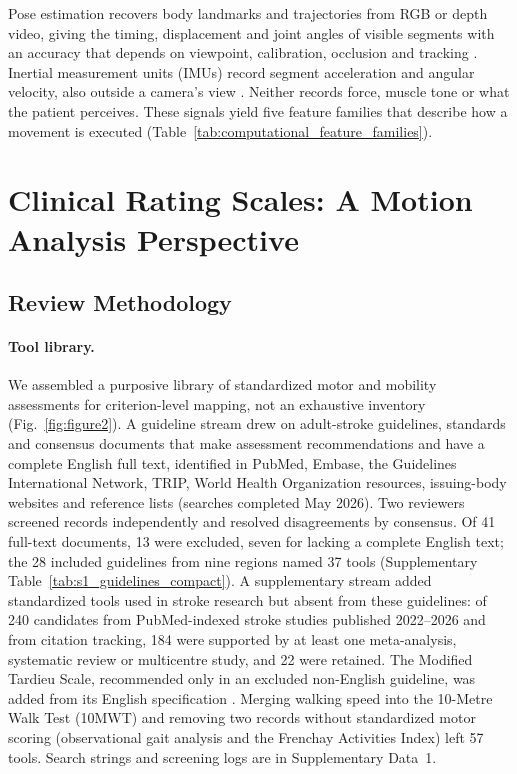 \documentclass[11pt]{article}
\begin{document}
Pose estimation recovers body landmarks and trajectories from RGB or depth video, giving the timing, displacement and joint angles of visible segments with an accuracy that depends on viewpoint, calibration, occlusion and tracking \cite{S3Luvizutto202234115576,S3Lonini202235224426,S3John202437682075}. Inertial measurement units (IMUs) record segment acceleration and angular velocity, also outside a camera's view \cite{S3OBrien202236304845,Yang2013SpatiotemporalGait}. Neither records force, muscle tone or what the patient perceives. These signals yield five feature families that describe how a movement is executed (Table~\ref{tab:computational_feature_families}).

\section{Clinical Rating Scales: A Motion Analysis Perspective}
\label{sec:scales}

\subsection{Review Methodology}

\paragraph{Tool library.} We assembled a purposive library of standardized motor and mobility assessments for criterion-level mapping, not an exhaustive inventory (Fig.~\ref{fig:figure2}). A guideline stream drew on adult-stroke guidelines, standards and consensus documents that make assessment recommendations and have a complete English full text, identified in PubMed, Embase, the Guidelines International Network, TRIP, World Health Organization resources, issuing-body websites and reference lists (searches completed May 2026). Two reviewers screened records independently and resolved disagreements by consensus. Of 41 full-text documents, 13 were excluded, seven for lacking a complete English text; the 28 included guidelines from nine regions named 37 tools (Supplementary Table~\ref{tab:s1_guidelines_compact}). A supplementary stream added standardized tools used in stroke research but absent from these guidelines: of 240 candidates from PubMed-indexed stroke studies published 2022--2026 and from citation tracking, 184 were supported by at least one meta-analysis, systematic review or multicentre study, and 22 were retained. The Modified Tardieu Scale, recommended only in an excluded non-English guideline, was added from its English specification \cite{S2RehabMeasuresModifiedTardieu}. Merging walking speed into the 10-Metre Walk Test (10MWT) and removing two records without standardized motor scoring (observational gait analysis and the Frenchay Activities Index) left 57 tools. Search strings and screening logs are in Supplementary Data~1.
\end{document}
